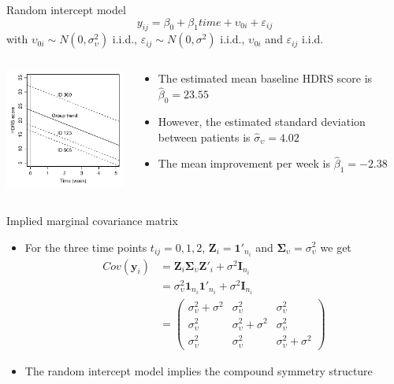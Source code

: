 \documentclass[aspectratio=169]{beamer}
\newcommand{\vect}[1]{\mathbf{#1}}
\newcommand{\mat}[1]{\mathbf{#1}}
\newcommand{\gmat}[1]{\boldsymbol{#1}}
\begin{document}
\begin{frame}[fragile]{Random intercept model}
  \[
    y_{ij} = \beta_0 + \beta_1 time + \upsilon_{0i} + \varepsilon_{ij}
  \]
with $\upsilon_{0i} \sim N(0, \sigma^2_{\upsilon})$ i.i.d.,
$\varepsilon_{ij} \sim N(0, \sigma^2)$ i.i.d., $\upsilon_{0i}$ and
$\varepsilon_{ij}$ i.i.d.\\[2ex]
\begin{columns}
\begin{column}{.4\textwidth}
\includegraphics[width=5.5cm]{fig/hdrs-lme1}
\end{column}
%
\begin{column}{.5\textwidth}
  \begin{itemize}
    \item The estimated mean baseline HDRS score is $\hat{\beta}_0 =
      23.55$
    \item However, the estimated standard deviation between patients is
      $\hat{\sigma}_\upsilon = 4.02$
    \item The mean improvement per week is $\hat{\beta}_1 = -2.38$
  \end{itemize}
  \vspace{1cm}
\end{column}
\end{columns}
\end{frame}

\begin{frame}{Implied marginal covariance matrix}
  \begin{itemize}
    \item For the three time points $t_{ij} = 0, 1, 2$, $\mat{Z}_i =
      \vect{1}'_{n_i}$ and $\gmat{\Sigma}_\upsilon = \sigma^2_\upsilon$ we
      get
\begin{align*}
  Cov(\vect{y}_i) &=
    \mat{Z}_i \gmat{\Sigma}_\upsilon \mat{Z}'_i + \sigma^2 \mat{I}_{n_i} \\
  &= \sigma^2_\upsilon \vect{1}_{n_i} \vect{1}'_{n_i} +
     \sigma^2 \mat{I}_{n_i} \\
  &= 
  \begin{pmatrix}
    \sigma^2_\upsilon + \sigma^2 & \sigma^2_\upsilon & \sigma^2_\upsilon \\
    \sigma^2_\upsilon & \sigma^2_\upsilon + \sigma^2 & \sigma^2_\upsilon \\
    \sigma^2_\upsilon & \sigma^2_\upsilon & \sigma^2_\upsilon + \sigma^2
  \end{pmatrix}
\end{align*}
\item The random intercept model implies the compound symmetry structure
  \end{itemize}
\end{frame}
\end{document}
